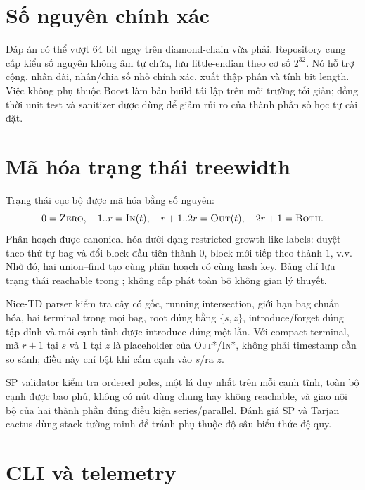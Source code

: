 \section{Số nguyên chính xác}

Đáp án có thể vượt 64 bit ngay trên diamond-chain vừa phải. Repository cung cấp kiểu số nguyên không âm tự chứa, lưu little-endian theo cơ số $2^{32}$. Nó hỗ trợ cộng, nhân dài, nhân/chia số nhỏ chính xác, xuất thập phân và tính bit length. Việc không phụ thuộc Boost làm bản build tái lập trên môi trường tối giản; đồng thời unit test và sanitizer được dùng để giảm rủi ro của thành phần số học tự cài đặt.

\section{Mã hóa trạng thái treewidth}

Trạng thái cục bộ được mã hóa bằng số nguyên:
\[
0=\textsc{Zero},\quad 1..r=\textsc{In}(t),\quad r+1..2r=\textsc{Out}(t),\quad 2r+1=\textsc{Both}.
\]
Phân hoạch được canonical hóa dưới dạng restricted-growth-like labels: duyệt theo thứ tự bag và đổi block đầu tiên thành $0$, block mới tiếp theo thành $1$, v.v. Nhờ đó, hai union--find tạo cùng phân hoạch có cùng hash key. Bảng chỉ lưu trạng thái reachable trong ; không cấp phát toàn bộ không gian lý thuyết.

Nice-TD parser kiểm tra cây có gốc, running intersection, giới hạn bag chuẩn hóa, hai terminal trong mọi bag, root đúng bằng $\{s,z\}$, introduce/forget đúng tập đỉnh và mỗi cạnh tĩnh được introduce đúng một lần. Với compact terminal, mã $r+1$ tại $s$ và $1$ tại $z$ là placeholder của \textsc{Out*}/\textsc{In*}, không phải timestamp cần so sánh; điều này chỉ bật khi cấm cạnh vào $s$/ra $z$.

SP validator kiểm tra ordered poles, một lá duy nhất trên mỗi cạnh tĩnh, toàn bộ cạnh được bao phủ, không có nút dùng chung hay không reachable, và giao nội bộ của hai thành phần đúng điều kiện series/parallel. Đánh giá SP và Tarjan cactus dùng stack tường minh để tránh phụ thuộc độ sâu biểu thức đệ quy.

\section{CLI và telemetry}

